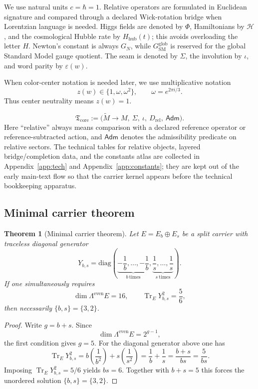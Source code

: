 \documentclass[11pt,a4paper]{article}
\newtheorem{theorem}{Theorem}[section]
\theoremstyle{definition}
\theoremstyle{remark}
\DeclareMathOperator{\tr}{Tr}
\newcommand{\Seam}{\Sigma}
\newcommand{\inv}{\iota}
\newcommand{\SM}{\mathrm{SM}}
\newcommand{\Hhub}{H_{\mathrm{hub}}}
\newcommand{\Tcore}{\mathfrak T_{\mathrm{core}}}
\begin{document}
We use natural units $c=\hbar=1$. Relative operators are formulated in Euclidean signature and compared through a declared Wick-rotation bridge when Lorentzian language is needed. Higgs fields are denoted by $\Phi$, Hamiltonians by $\mathcal H$, and the cosmological Hubble rate by $\Hhub(t)$; this avoids overloading the letter $H$. Newton's constant is always $G_N$, while $G_{\SM}^{\mathrm{glob}}$ is reserved for the global Standard Model gauge quotient. The seam is denoted by $\Seam$, the involution by $\inv$, and word parity by $\varepsilon(w)$.

When color-center notation is needed later, we use multiplicative notation
\[
z(w)\in\{1,\omega,\omega^2\},
\qquad
\omega=e^{2\pi i/3}.
\]
Thus center neutrality means $z(w)=1$.

\[
\Tcore
:=
\bigl(
\widetilde M\to M,\ \Seam,\ \inv,\ D_{\mathrm{rel}},\ \mathsf{Adm}
\bigr).
\]
Here \enquote{relative} always means comparison with a declared reference operator or reference-subtracted action, and $\mathsf{Adm}$ denotes the admissibility predicate on relative sectors. The technical tables for relative objects, layered bridge/completion data, and the constants atlas are collected in Appendix~\ref{app:tech} and Appendix~\ref{app:constants}; they are kept out of the early main-text flow so that the carrier kernel appears before the technical bookkeeping apparatus.

\subsection{Minimal carrier theorem}
\label{sec:minimal-carrier-proof}

\begin{theorem}[Minimal carrier theorem]
Let $E=E_b\oplus E_s$ be a split carrier with traceless diagonal generator
\[
Y_{b,s}
=
\mathrm{diag}\!\left(
\underbrace{-\frac1b,\ldots,-\frac1b}_{b\ \text{times}},
\underbrace{\frac1s,\ldots,\frac1s}_{s\ \text{times}}
\right).
\]
If one simultaneously requires
\begin{equation}
\label{eq:minimal-carrier-conditions}
\dim \Lambda^{\mathrm{even}}E=16,
\qquad
\tr_E Y_{b,s}^2=\frac56,
\end{equation}
then necessarily $\{b,s\}=\{3,2\}$.
\end{theorem}

\begin{proof}
Write $g=b+s$. Since
\[
\dim \Lambda^{\mathrm{even}}E=2^{g-1},
\]
the first condition gives $g=5$. For the diagonal generator above one has
\[
\tr_E Y_{b,s}^2
=
b\left(\frac{1}{b^2}\right)+s\left(\frac{1}{s^2}\right)
=
\frac1b+\frac1s
=
\frac{b+s}{bs}
=
\frac{5}{bs}.
\]
Imposing $\tr_E Y_{b,s}^2=5/6$ yields $bs=6$. Together with $b+s=5$ this forces the unordered solution $\{b,s\}=\{3,2\}$.
\end{proof}
\end{document}
